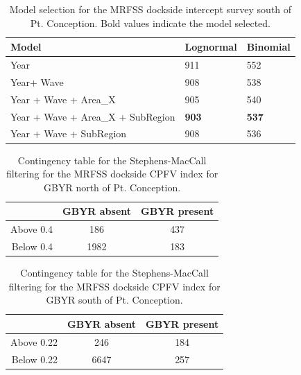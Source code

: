 \documentclass[12pt,]{article}
\begin{document}
\vspace{3cm}

\begin{table}[ht]
\centering
\caption{Model selection for the MRFSS dockside intercept 
                                        survey south of Pt. Conception. Bold 
                                        values indicate the model selected.} 
\label{tab:Fleet11_AIC}
\begin{tabular}{lll}
  \hline
Model & Lognormal & Binomial \\ 
  \hline
Year & 911 & 552 \\ 
  Year+ Wave & 908 & 538 \\ 
  Year + Wave + Area\_X & 905 & 540 \\ 
  Year + Wave + Area\_X + SubRegion & \textbf{903} & \textbf{537} \\ 
  Year + Wave + SubRegion & 908 & 536 \\ 
   \hline
\end{tabular}
\end{table}

\begin{table}[ht]
\centering
\caption{Contingency table for the Stephens-MacCall 
                                            filtering for the MRFSS dockside CPFV index 
                                            for GBYR north of Pt. Conception.} 
\label{tab:Fleet10_contingency}
\begin{tabular}{rcc}
  \hline
  & GBYR absent & GBYR present \\ 
  \hline
Above 0.4 & 186 & 437 \\ 
  Below 0.4 & 1982 & 183 \\ 
   \hline
\end{tabular}
\end{table}

\begin{table}[ht]
\centering
\caption{Contingency table for the Stephens-MacCall 
                                            filtering for the MRFSS dockside CPFV index 
                                            for GBYR south of Pt. Conception.} 
\label{tab:Fleet11_contingency}
\begin{tabular}{rcc}
  \hline
  & GBYR absent & GBYR present \\ 
  \hline
Above 0.22 & 246 & 184 \\ 
  Below 0.22 & 6647 & 257 \\ 
   \hline
\end{tabular}
\end{table}
\end{document}
